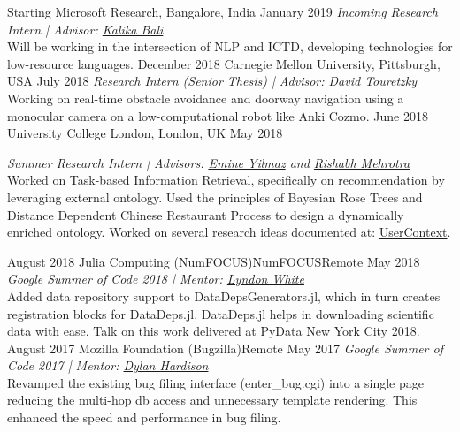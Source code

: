 %
%
%
\begin{experiences}
\researchexperience
    {Starting}   {Microsoft Research, Bangalore, India}{}{}
    {January 2019} {\textit{Incoming Research Intern | Advisor:  \href{https://www.microsoft.com/en-us/research/people/kalikab/}{Kalika Bali}}\\
    Will be working in the intersection of NLP and ICTD, developing technologies for low-resource languages.}
  \emptySeparator
 \researchexperience
    {December 2018}   {Carnegie Mellon University, Pittsburgh, USA}{}{}
    {July 2018} {\textit{Research Intern (Senior Thesis) | Advisor:  \href{http://www.cs.cmu.edu/~dst/}{David Touretzky}}\\
    Working on real-time obstacle avoidance and doorway navigation using a monocular camera on a low-computational robot like Anki Cozmo.                                                        
                    }
  \emptySeparator
   \researchexperience
    {June 2018}   {University College London, London, UK}{}{}
    {May 2018} {\textit{Summer Research Intern | Advisors: \href{https://sites.google.com/site/emineyilmaz/}{Emine Yilmaz} and \href{http://www.rishabhmehrotra.com/}{Rishabh Mehrotra}}\\
                       Worked on Task-based Information Retrieval, specifically on recommendation by leveraging external ontology. Used the principles of Bayesian Rose Trees and Distance Dependent Chinese Restaurant Process to design a dynamically enriched ontology.
                        Worked on several research ideas documented at: \href{https://usercontext.github.io/}{UserContext}.
                     
                    }
  \emptySeparator
    \researchexperience
    {August 2018}   {Julia Computing (NumFOCUS)}{NumFOCUS}{Remote}
    {May 2018} {\textit{Google Summer of Code 2018 | Mentor: \href{https://white.ucc.asn.au/}{Lyndon White}}\\
    Added data repository support to DataDepsGenerators.jl, which in turn creates registration blocks for DataDeps.jl. DataDeps.jl helps in downloading scientific data with ease. Talk on this work delivered at PyData New York City 2018.
                    }
  \emptySeparator
   \researchexperience
    {August 2017}   {Mozilla Foundation (Bugzilla)}{}{Remote}
    {May 2017} {\textit{Google Summer of Code 2017 | Mentor: \href{https://www.linkedin.com/in/dylanwh}{Dylan Hardison}}\\
    Revamped the existing bug filing interface (enter\_bug.cgi) into a single page reducing the multi-hop db access and unnecessary template rendering. This enhanced the speed and performance in bug filing.
                    }
  
\end{experiences}
\vspace{-4mm}
